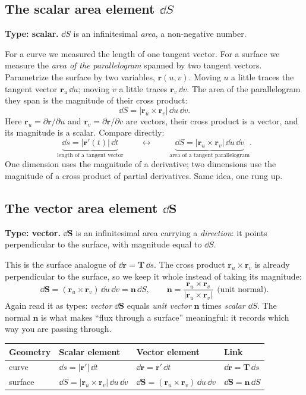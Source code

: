\documentclass{essay}
\newcommand{\rr}{\mathbf{r}}
\newcommand{\nn}{\mathbf{n}}
\newcommand{\TT}{\mathbf{T}}
\begin{document}
\subsection{The scalar area element $\dd S$}

\textbf{Type: scalar.} $\dd S$ is an infinitesimal \emph{area}, a non-negative
number.

For a curve we measured the length of one tangent vector. For a surface we measure
the \emph{area of the parallelogram} spanned by two tangent vectors. Parametrize the
surface by two variables, $\rr(u,v)$. Moving $u$ a little traces the tangent vector
$\rr_u\,\dd u$; moving $v$ a little traces $\rr_v\,\dd v$. The area of the
parallelogram they span is the magnitude of their cross product:
\[
  \dd S = \bigl\lvert \rr_u \times \rr_v \bigr\rvert \,\dd u\,\dd v .
\]
Here $\rr_u=\partial\rr/\partial u$ and $\rr_v=\partial\rr/\partial v$ are vectors,
their cross product is a vector, and its magnitude is a scalar. Compare directly:
\[
  \underbrace{\dd s = \lvert\rr'(t)\rvert\,\dd t}_{\text{length of a tangent vector}}
  \qquad\longleftrightarrow\qquad
  \underbrace{\dd S = \lvert\rr_u\times\rr_v\rvert\,\dd u\,\dd v}_{\text{area of a tangent parallelogram}} .
\]
One dimension uses the magnitude of a derivative; two dimensions use the magnitude
of a cross product of partial derivatives. Same idea, one rung up.

\subsection{The vector area element $\dd\mathbf{S}$}

\textbf{Type: vector.} $\dd\mathbf{S}$ is an infinitesimal area carrying a
\emph{direction}: it points perpendicular to the surface, with magnitude equal to
$\dd S$.

This is the surface analogue of $\dd\mathbf{r}=\TT\,\dd s$. The cross product
$\rr_u\times\rr_v$ is already perpendicular to the surface, so we keep it whole
instead of taking its magnitude:
\[
  \dd\mathbf{S} = (\rr_u \times \rr_v)\,\dd u\,\dd v = \nn\,\dd S,
  \qquad
  \nn = \frac{\rr_u\times\rr_v}{\lvert\rr_u\times\rr_v\rvert}\ \ \text{(unit normal).}
\]
Again read it as types: \emph{vector} $\dd\mathbf{S}$ equals \emph{unit vector}
$\nn$ times \emph{scalar} $\dd S$. The normal $\nn$ is what makes ``flux through a
surface'' meaningful: it records which way you are passing through.

\begin{center}
  \renewcommand{\arraystretch}{1.35}
  \begin{tabular}{@{}l l l l@{}}
    \toprule
    \textbf{Geometry} & \textbf{Scalar element} & \textbf{Vector element} & \textbf{Link} \\
    \midrule
    curve   & $\dd s = \lvert\rr'\rvert\,\dd t$
    & $\dd\mathbf{r}=\rr'\,\dd t$
    & $\dd\mathbf{r}=\TT\,\dd s$ \\
    surface & $\dd S=\lvert\rr_u\times\rr_v\rvert\,\dd u\,\dd v$
    & $\dd\mathbf{S}=(\rr_u\times\rr_v)\,\dd u\,\dd v$
    & $\dd\mathbf{S}=\nn\,\dd S$ \\
    \bottomrule
  \end{tabular}
\end{center}
\end{document}
